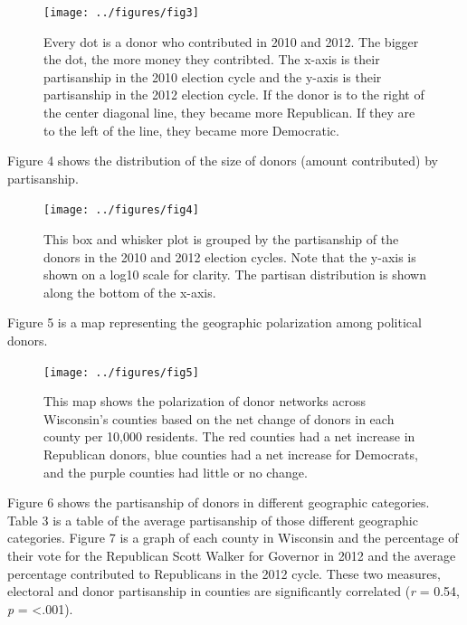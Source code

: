 \documentclass[12pt,]{article}
\begin{document}
\begin{figure}
\texttt{[image: ../figures/fig3]} \caption{Every dot is a donor who contributed in 2010 and 2012. The bigger the dot, the more money they contribted. The x-axis is their partisanship in the 2010 election cycle and the y-axis is their partisanship in the 2012 election cycle. If the donor is to the right of the center diagonal line, they became more Republican. If they are to the left of the line, they became more Democratic.}\label{fig:unnamed-chunk-5}
\end{figure}

Figure 4 shows the distribution of the size of donors (amount
contributed) by partisanship.

\begin{figure}
\texttt{[image: ../figures/fig4]} \caption{This box and whisker plot is grouped by the partisanship of the donors in the 2010 and 2012 election cycles. Note that the y-axis is shown on a log10 scale for clarity. The partisan distribution is shown along the bottom of the x-axis.}\label{fig:unnamed-chunk-6}
\end{figure}

Figure 5 is a map representing the geographic polarization among
political donors.

\begin{figure}
\texttt{[image: ../figures/fig5]} \caption{This map shows the polarization of donor networks across Wisconsin's counties based on the net change of donors in each county per 10,000 residents. The red counties had a net increase in Republican donors, blue counties had a net increase for Democrats, and the purple counties had little or no change.}\label{fig:unnamed-chunk-7}
\end{figure}

Figure 6 shows the partisanship of donors in different geographic
categories. Table 3 is a table of the average partisanship of those
different geographic categories. Figure 7 is a graph of each county in
Wisconsin and the percentage of their vote for the Republican Scott
Walker for Governor in 2012 and the average percentage contributed to
Republicans in the 2012 cycle. These two measures, electoral and donor
partisanship in counties are significantly correlated (\emph{r} = 0.54,
\emph{p} = \textless.001).
\end{document}
